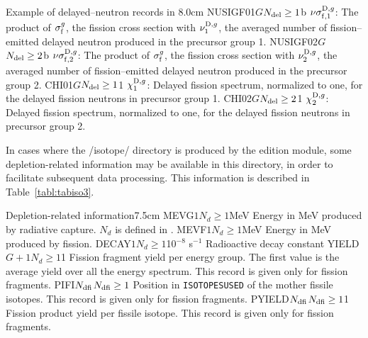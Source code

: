 \begin{DescriptionEnregistrement}{Example of delayed--neutron records in
}{8.0cm}
\OptRealEnr
  {NUSIGF01}{$G$}{$N_{\rm del}\ge 1$}{b}
  {$\nu\sigma_{{\rm f},1}^{{\rm D},g}$: The product of $\sigma_{\rm f}^{g}$, the fission cross section with
   $\nu_1^{{\rm D},g}$, the averaged number of fission--emitted delayed
   neutron produced in the precursor group 1.}
\OptRealEnr
  {NUSIGF02}{$G$}{$N_{\rm del}\ge 2$}{b}
  {$\nu\sigma_{{\rm f},2}^{{\rm D},g}$: The product of $\sigma_{\rm f}^{g}$, the fission cross section with
   $\nu_2^{{\rm D},g}$, the averaged number of fission--emitted delayed
   neutron produced in the precursor group 2.}
\OptRealEnr
  {CHI01}{$G$}{$N_{\rm del}\ge 1$}{1}
  {$\chi^{{\rm D},g}_1$: Delayed fission spectrum,
   normalized to one, for the delayed fission neutrons in
   precursor group 1.}
\OptRealEnr
  {CHI02}{$G$}{$N_{\rm del}\ge 2$}{1}
  {$\chi^{{\rm D},g}_2$: Delayed fission spectrum,
   normalized to one, for the delayed fission neutrons in
   precursor group 2.}
\end{DescriptionEnregistrement}

\vskip 0.2cm

In cases where the /isotope/ directory is produced by the edition module, some
depletion-related information may be available in this directory, in order to facilitate
subsequent data processing. This information is described in
Table~\ref{tabl:tabiso3}.

\begin{DescriptionEnregistrement}{Depletion-related information}{7.5cm}
\label{tabl:tabiso3}
\OptRealEnr
  {MEVG}{$1$}{$N_d \ge 1$}{MeV}
  {Energy in MeV produced by radiative capture. $N_d$ is defined in .}
\OptRealEnr
  {MEVF}{$1$}{$N_d \ge 1$}{MeV}
  {Energy in MeV produced by fission.}
\OptRealEnr
  {DECAY}{$1$}{$N_d \ge 1$}{10$^{-8}$ s$^{-1}$}
  {Radioactive decay constant}
\OptRealEnr
  {YIELD}{$G+1$}{$N_d \ge 1$}{1}
  {Fission fragment yield per energy group. The first value is the average yield
  over all the energy spectrum. This record is given only for fission fragments.}
\OptIntEnr
  {PIFI}{$N_{\rm dfi}$}{$N_{\rm dfi} \ge 1$}
  {Position in {\tt ISOTOPESUSED} of the mother fissile isotopes. This record is
  given only for fission fragments.}
\OptRealEnr
  {PYIELD}{$N_{\rm dfi}$}{$N_{\rm dfi} \ge 1$}{1}
  {Fission product yield per fissile isotope. This record is given only for
  fission fragments.}
\end{DescriptionEnregistrement}

